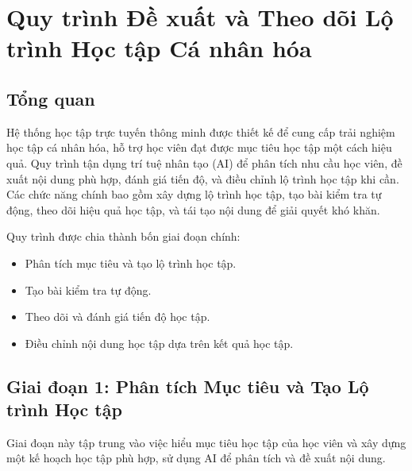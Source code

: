 

\section{Quy trình Đề xuất và Theo dõi Lộ trình Học tập Cá nhân hóa}

\subsection{Tổng quan}
Hệ thống học tập trực tuyến thông minh được thiết kế để cung cấp trải nghiệm học tập cá nhân hóa, hỗ trợ học viên đạt được mục tiêu học tập một cách hiệu quả. Quy trình tận dụng trí tuệ nhân tạo (AI) để phân tích nhu cầu học viên, đề xuất nội dung phù hợp, đánh giá tiến độ, và điều chỉnh lộ trình học tập khi cần. Các chức năng chính bao gồm xây dựng lộ trình học tập, tạo bài kiểm tra tự động, theo dõi hiệu quả học tập, và tái tạo nội dung để giải quyết khó khăn.

Quy trình được chia thành bốn giai đoạn chính:
\begin{itemize}
	\item Phân tích mục tiêu và tạo lộ trình học tập.
	\item Tạo bài kiểm tra tự động.
	\item Theo dõi và đánh giá tiến độ học tập.
	\item Điều chỉnh nội dung học tập dựa trên kết quả học tập.
\end{itemize}

\subsection{Giai đoạn 1: Phân tích Mục tiêu và Tạo Lộ trình Học tập}
Giai đoạn này tập trung vào việc hiểu mục tiêu học tập của học viên và xây dựng một kế hoạch học tập phù hợp, sử dụng AI để phân tích và đề xuất nội dung.

